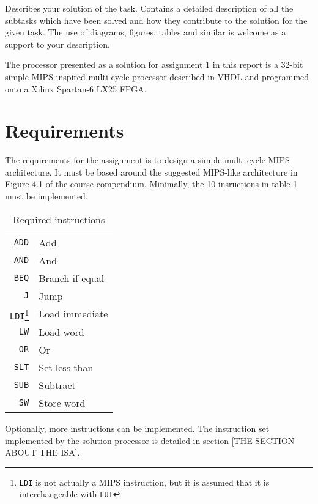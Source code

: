 Describes your solution of the task.
Contains a detailed description of all the subtasks which have been solved and how they contribute to the solution for the given task.
The use of diagrams, figures, tables and similar is welcome as a support to your description.

The processor presented as a solution for assignment 1 in this report is a 32-bit simple MIPS-inspired multi-cycle processor described in VHDL and programmed onto a Xilinx Spartan-6 LX25 FPGA.

\section{Requirements}

The requirements for the assignment is to design a simple multi-cycle MIPS architecture.
It must be based around the suggested MIPS-like architecture in Figure 4.1 of the course compendium\cite{compendium}.
Minimally, the 10 insructions in table \ref{table:required-instructions} must be implemented.

\begin{table}
    \begin{center}
        \begin{tabular}{r|l}
            \texttt{ADD} & Add \\
            \texttt{AND} & And \\
            \texttt{BEQ} & Branch if equal \\
            \texttt{J} & Jump \\
            \texttt{LDI}\footnote{\texttt{LDI} is not actually a MIPS instruction, but it is assumed that it is interchangeable with \texttt{LUI}} & Load immediate \\
            \texttt{LW} & Load word \\
            \texttt{OR} & Or \\
            \texttt{SLT} & Set less than \\
            \texttt{SUB} & Subtract \\
            \texttt{SW} & Store word \\
            \hline
        \end{tabular}
        \smallskip
        \smallskip
        \caption{Required instructions}
        \label{table:required-instructions}
    \end{center}
\end{table}

Optionally, more instructions can be implemented.
The instruction set implemented by the solution processor is detailed in section [THE SECTION ABOUT THE ISA].

